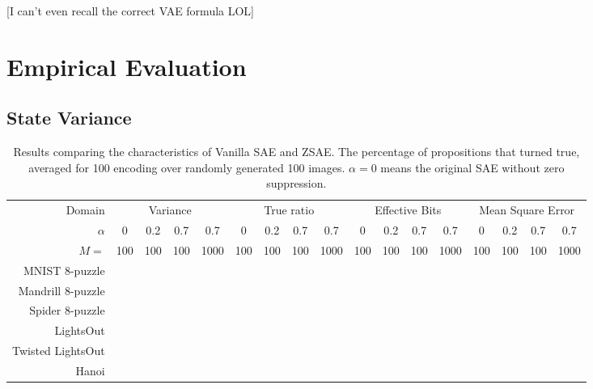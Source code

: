 [I can't even recall the correct VAE formula LOL]

\section{Empirical Evaluation}
\label{evaluation}

\subsection{State Variance}

\begin{table*}[htb]
 \centering
 \begin{tabular}{|r|*{16}{c|}}
  Domain            & \multicolumn{4}{c|}{Variance} & \multicolumn{4}{c|}{True ratio}  & \multicolumn{4}{c|}{Effective Bits}  & \multicolumn{4}{c|}{Mean Square Error} \\
  $\alpha$          & 0   & 0.2 & 0.7 & 0.7  & 0   & 0.2 & 0.7 & 0.7  & 0   & 0.2 & 0.7 & 0.7  & 0   & 0.2 & 0.7 & 0.7  \\
  $M=$              & 100 & 100 & 100 & 1000 & 100 & 100 & 100 & 1000 & 100 & 100 & 100 & 1000 & 100 & 100 & 100 & 1000 \\
  MNIST    8-puzzle &     &     &     &      &     &     &     &      &     &     &     &      &     &     &     &      \\
  Mandrill 8-puzzle &     &     &     &      &     &     &     &      &     &     &     &      &     &     &     &      \\
  Spider   8-puzzle &     &     &     &      &     &     &     &      &     &     &     &      &     &     &     &      \\
  LightsOut         &     &     &     &      &     &     &     &      &     &     &     &      &     &     &     &      \\
  Twisted LightsOut &     &     &     &      &     &     &     &      &     &     &     &      &     &     &     &      \\
  Hanoi             &     &     &     &      &     &     &     &      &     &     &     &      &     &     &     &      \\
 \end{tabular}
 \caption{Results comparing the characteristics of Vanilla SAE and ZSAE.
The percentage of propositions that turned true, averaged for
 100 encoding over randomly generated 100 images.
 $\alpha=0$ means the original SAE without zero suppression.
 }
 \label{tab:stability}
\end{table*}

